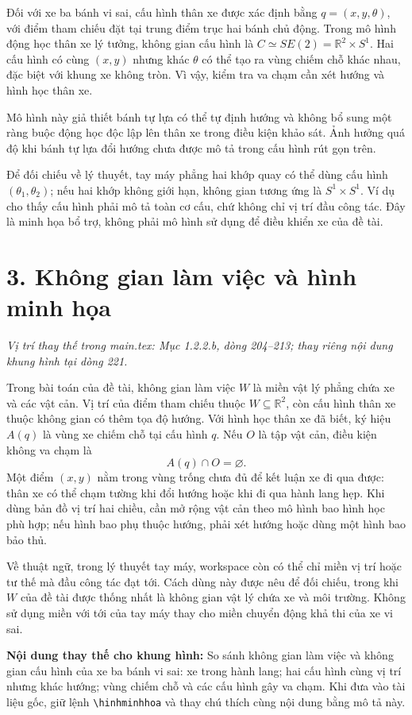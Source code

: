 \documentclass[12pt,a4paper,oneside]{report}
\newcommand{\vitri}[1]{\par\noindent\textit{Vị trí thay thế trong main.tex: #1.}\par}
\begin{document}
Đối với xe ba bánh vi sai, cấu hình thân xe được xác định bằng \(q=(x,y,\theta)\), với điểm tham chiếu đặt tại trung điểm trục hai bánh chủ động. Trong mô hình động học thân xe lý tưởng, không gian cấu hình là \(C\simeq SE(2)=\mathbb R^2\times S^1\). Hai cấu hình có cùng \((x,y)\) nhưng khác \(\theta\) có thể tạo ra vùng chiếm chỗ khác nhau, đặc biệt với khung xe không tròn. Vì vậy, kiểm tra va chạm cần xét hướng và hình học thân xe.

Mô hình này giả thiết bánh tự lựa có thể tự định hướng và không bổ sung một ràng buộc động học độc lập lên thân xe trong điều kiện khảo sát. Ảnh hưởng quá độ khi bánh tự lựa đổi hướng chưa được mô tả trong cấu hình rút gọn trên.

Để đối chiếu về lý thuyết, tay máy phẳng hai khớp quay có thể dùng cấu hình \((\theta_1,\theta_2)\); nếu hai khớp không giới hạn, không gian tương ứng là \(S^1\times S^1\). Ví dụ cho thấy cấu hình phải mô tả toàn cơ cấu, chứ không chỉ vị trí đầu công tác. Đây là minh họa bổ trợ, không phải mô hình sử dụng để điều khiển xe của đề tài.

\section*{3. Không gian làm việc và hình minh họa}
\vitri{Mục 1.2.2.b, dòng 204--213; thay riêng nội dung khung hình tại dòng 221}

Trong bài toán của đề tài, không gian làm việc \(W\) là miền vật lý phẳng chứa xe và các vật cản. Vị trí của điểm tham chiếu thuộc \(W\subseteq\mathbb R^2\), còn cấu hình thân xe thuộc không gian có thêm tọa độ hướng. Với hình học thân xe đã biết, ký hiệu \(A(q)\) là vùng xe chiếm chỗ tại cấu hình \(q\). Nếu \(O\) là tập vật cản, điều kiện không va chạm là
\[
  A(q)\cap O=\varnothing.
\]
Một điểm \((x,y)\) nằm trong vùng trống chưa đủ để kết luận xe đi qua được: thân xe có thể chạm tường khi đổi hướng hoặc khi đi qua hành lang hẹp. Khi dùng bản đồ vị trí hai chiều, cần mở rộng vật cản theo mô hình bao hình học phù hợp; nếu hình bao phụ thuộc hướng, phải xét hướng hoặc dùng một hình bao bảo thủ.

Về thuật ngữ, trong lý thuyết tay máy, workspace còn có thể chỉ miền vị trí hoặc tư thế mà đầu công tác đạt tới. Cách dùng này được nêu để đối chiếu, trong khi \(W\) của đề tài được thống nhất là không gian vật lý chứa xe và môi trường. Không sử dụng miền với tới của tay máy thay cho miền chuyển động khả thi của xe vi sai.

\noindent\textbf{Nội dung thay thế cho khung hình:} So sánh không gian làm việc và không gian cấu hình của xe ba bánh vi sai: xe trong hành lang; hai cấu hình cùng vị trí nhưng khác hướng; vùng chiếm chỗ và các cấu hình gây va chạm. Khi đưa vào tài liệu gốc, giữ lệnh \verb|\hinhminhhoa| và thay chú thích cùng nội dung bằng mô tả này.
\end{document}
